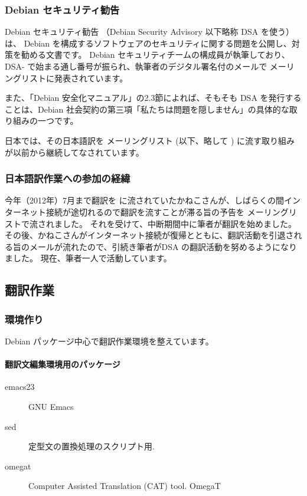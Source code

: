 \documentclass[mingoth,a4paper]{jsarticle}
\begin{document}
\subsubsection{Debian セキュリティ勧告}

Debian セキュリティ勧告 （Debian Security Advisory 以下略称 DSA を使う）は、
Debian を構成するソフトウェアのセキュリティに関する問題を公開し、対策を勧める文書です。
Debian セキュリティチームの構成員が執筆しており、DSA- で始まる通し番号が振られ、執筆者のデジタル署名付のメールで  メーリングリストに発表されています。

また、「Debian 安全化マニュアル」の2.3節\cite{securehowto2.3}によれば、そもそも DSA を発行することは、Debian 社会契約\cite{socialcontract}の第三項「私たちは問題を隠しません」の具体的な取り組みの一つです。

日本では、その日本語訳を  メーリングリスト (以下、略して ) に流す取り組みが以前から継続してなされています。


\subsubsection{日本語訳作業への参加の経緯}

今年（2012年）7月まで翻訳を  に流されていたかねこさんが、しばらくの間インターネット接続が途切れるので翻訳を流すことが滞る旨の予告を  メーリングリストで流されました。
それを受けて、中断期間中に筆者が翻訳を始めました。その後、かねこさんがインターネット接続が復帰とともに、翻訳活動を引退される旨のメールが流れたので、引続き筆者がDSA の翻訳活動を努めるようになりました。
現在、筆者一人で活動しています。


\subsection{翻訳作業}

\subsubsection{環境作り}

Debian パッケージ中心で翻訳作業環境を整えています。

\paragraph{翻訳文編集環境用のパッケージ}

\begin{description}
\item[emacs23] GNU Emacs
\item[sed] 定型文の置換処理のスクリプト用.
\item[omegat] Computer Assisted Translation (CAT) tool. OmegaT
\end{description}
\end{document}
